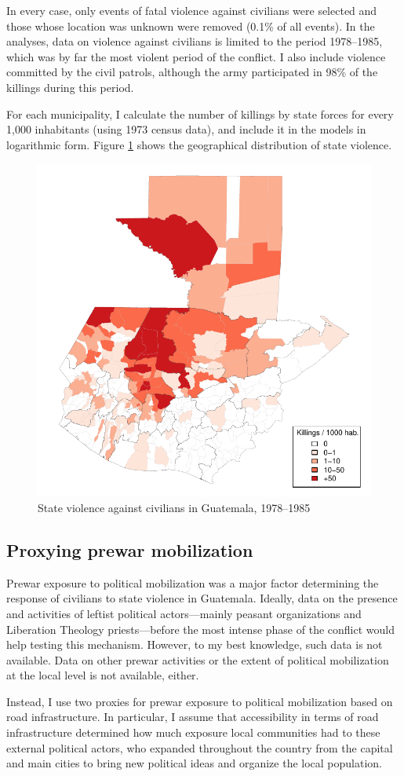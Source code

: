\documentclass[12pt, notitlepage]{article}
\begin{document}
In every case, only events of fatal violence against civilians were selected and those whose location was unknown were removed (0.1\% of all events).
In the analyses, data on violence against civilians is limited to the period 1978--1985, which was by far the most violent period of the conflict.%
I also include violence committed by the civil patrols, although the army participated in 98\% of the killings during this period.

For each municipality, I calculate the number of killings by state forces for every 1,000 inhabitants (using 1973 census data), and include it in the models in logarithmic form.
Figure \ref{fig:map_govt_vi} shows the geographical distribution of state violence.

\begin{figure}[htb!]
  \centering
    \includegraphics[width = .4\textwidth]{img/map_govt_vi}

  \caption{State violence against civilians in Guatemala, 1978--1985} \label{fig:map_govt_vi}

\end{figure}

\subsection*{Proxying prewar mobilization}

Prewar exposure to political mobilization was a major factor determining the response of civilians to state violence in Guatemala.
Ideally, data on the presence and activities of leftist political actors---mainly peasant organizations and Liberation Theology priests---before the most intense phase of the conflict would help testing this mechanism.
However, to my best knowledge, such data is not available.
Data on other prewar activities or the extent of political mobilization at the local level is not available, either.

Instead, I use two proxies for prewar exposure to political mobilization based on road infrastructure.
In particular, I assume that accessibility in terms of road infrastructure determined how much exposure local communities had to these external political actors, who expanded throughout the country from the capital and main cities to bring new political ideas and organize the local population.
\end{document}
